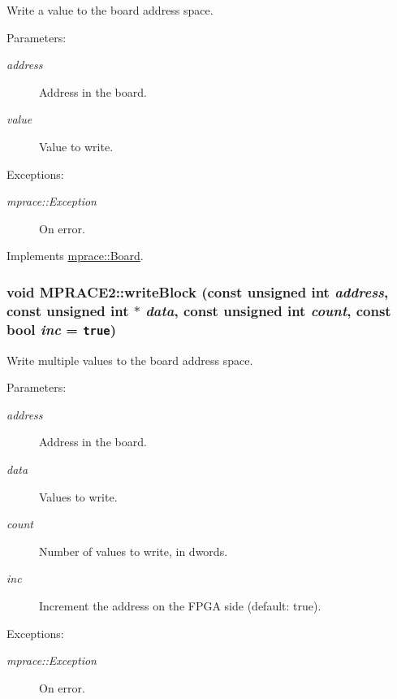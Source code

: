 Write a value to the board address space. 

\begin{Desc}
\item[Parameters:]
\begin{description}
\item[{\em address}]Address in the board. \item[{\em value}]Value to write. \end{description}
\end{Desc}
\begin{Desc}
\item[Exceptions:]
\begin{description}
\item[{\em mprace::Exception}]On error.\end{description}
\end{Desc}


Implements \hyperlink{classmprace_1_1Board_a3}{mprace::Board}.\hypertarget{classmprace_1_1MPRACE2_a4}{
\subsubsection[writeBlock]{\setlength{\rightskip}{0pt plus 5cm}void MPRACE2::write\-Block (const unsigned int {\em address}, const unsigned int $\ast$ {\em data}, const unsigned int {\em count}, const bool {\em inc} = {\tt true})}}
\label{classmprace_1_1MPRACE2_a4}


Write multiple values to the board address space. 

\begin{Desc}
\item[Parameters:]
\begin{description}
\item[{\em address}]Address in the board. \item[{\em data}]Values to write. \item[{\em count}]Number of values to write, in dwords. \item[{\em inc}]Increment the address on the FPGA side (default: true). \end{description}
\end{Desc}
\begin{Desc}
\item[Exceptions:]
\begin{description}
\item[{\em mprace::Exception}]On error.\end{description}
\end{Desc}


